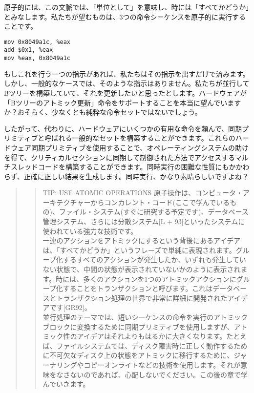 原子的には、この文脈では、「単位として」を意味し、時には「すべてかどうか」とみなします。私たちが望むものは、3つの命令シーケンスを原子的に実行することです。

\begin{verbatim}
mov 0x8049a1c, %eax
add $0x1, %eax
mov %eax, 0x8049a1c
\end{verbatim}

もしこれを行う一つの指示があれば、私たちはその指示を出すだけで済みます。しかし、一般的なケースでは、そのような指示はありません。私たちが並行してBツリーを構築していて、それを更新したいと思ったとします。ハードウェアが「Bツリーのアトミック更新」命令をサポートすることを本当に望んでいますか？おそらく、少なくとも純粋な命令セットではないでしょう。

したがって、代わりに、ハードウェアにいくつかの有用な命令を頼んで、同期プリミティブと呼ばれる一般的なセットを構築することができます。これらのハードウェア同期プリミティブを使用することで、オペレーティングシステムの助けを得て、クリティカルセクションに同期して制御された方法でアクセスするマルチスレッドコードを構築することができます。同時実行の困難な性質にもかかわらず、正確に正しい結果を生成します。同時実行、かなり素晴らしいですよね？

\begin{quote}
\begin{quote}
TIP: USE ATOMIC OPERATIONS
原子操作は、コンピュータ・アーキテクチャーからコンカレント・コード(ここで学んでいるもの)、ファイル・システム(すぐに研究する予定です)、データベース管理システム、さらには分散システム{[}L
+ 93{]}といったシステムに使われている強力な技術です。\\
一連のアクションをアトミックにするという背後にあるアイデアは、「すべてかどうか」というフレーズで単純に表現されます。グループ化するすべてのアクションが発生したか、いずれも発生していない状態で、中間の状態が表示されていないかのように表示されます。時には、多くのアクションを1つのアトミックアクションにグループ化することをトランザクションと呼びます。これはデータベースとトランザクション処理の世界で非常に詳細に開発されたアイデアです{[}GR92{]}。\\
並行処理のテーマでは、短いシーケンスの命令を実行のアトミックブロックに変換するために同期プリミティブを使用しますが、アトミック性のアイデアはそれよりもはるかに大きくなります。たとえば、ファイルシステムでは、ディスク障害時に正しく動作するために不可欠なディスク上の状態をアトミックに移行するために、ジャーナリングやコピーオンライトなどの技術を使用します。それが意味をなさないのであれば、心配しないでください。この後の章で学んでいきます。
\end{quote}
\end{quote}

